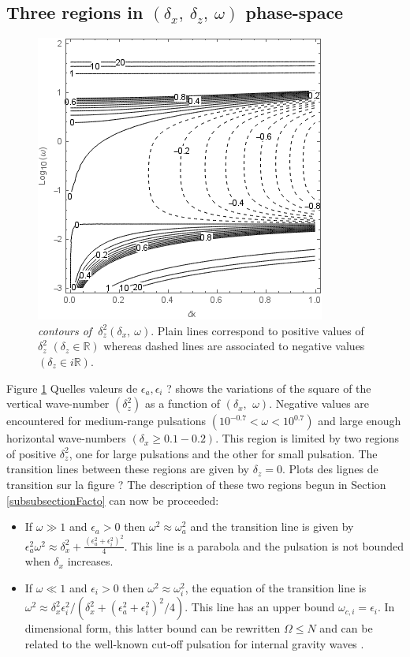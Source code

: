 \documentclass[a4paper,11pt]{article}
\begin{document}
\subsection{Three regions in $(\delta_x,\ \delta_z,\ \omega)$ phase-space}
\label{SubSectionDeltaz}
\begin{figure}[!h]
	\centering	
	\includegraphics[width=0.5\linewidth]{FIGURES/Contour_dz.png}
	\caption{\textit{contours of $\ \delta_z^2(\delta_x,\ \omega)$}. Plain lines correspond to positive values of $\delta_z^2$ $(\delta_z\in\mathbb{R})$ whereas dashed lines are associated to negative values $(\delta_z\in i\mathbb{R})$.}
	\label{FigContourdz}
\end{figure}
Figure \ref{FigContourdz} {\color{red}Quelles valeurs de $\epsilon_a, \epsilon_i$ ?} shows the variations of the square of the vertical wave-number $(\delta_z^2)$ as a function of $(\delta_x,\ \,\omega)$.  Negative values are encountered for medium-range pulsations $(10^{-0.7}<\omega<10^{0.7})$ and large enough horizontal wave-numbers $(\delta_x \geq 0.1-0.2)$. This region is limited by two regions of positive $\delta_z^2$, one for large pulsations and the other for small pulsation. The transition lines between these regions are given by $\delta_z=0$. {\color{red}Plots des lignes de transition sur la figure ?} The description of these two regions begun in Section \ref{subsubsectionFacto} can now be proceeded:
\begin{itemize}
	\item If $\omega \gg 1$ and $\epsilon_a>0$ then $\omega^2\approx\omega_a^2$ and the transition line is given by 
	$\epsilon_a^2\omega^2 \approx
	\delta_x^2
 	+\frac{(\epsilon_a^2+\epsilon_i^2)^2}{4}$. This line is a parabola and the pulsation is not bounded when $\delta_x$ increases. 
	\item If $\omega \ll 1$ and $\epsilon_i>0$ then $\omega^2\approx\omega_i^2$, the equation of the transition line is $\omega^2\approx\delta_x^2\epsilon_i^2/(\delta_x^2+(\epsilon_a^2+\epsilon_i^2)^2/4)$. This line has an upper bound $\omega_{c,i}=\epsilon_i$.
	In dimensional form, this latter bound can be rewritten $\Omega\leq N$ and can be related to the well-known cut-off pulsation for internal gravity waves \cite{dukowicz_2013}.
\end{itemize}
\end{document}
